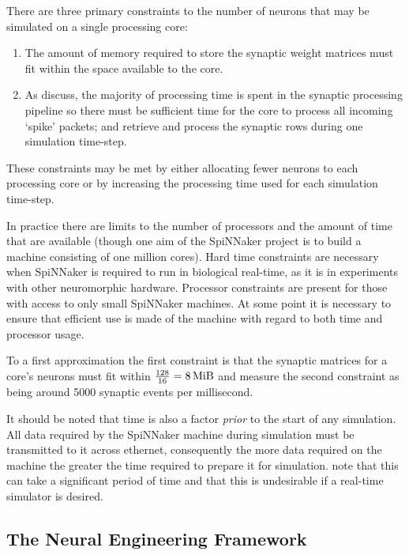 \documentclass[conference]{IEEEtran}
\begin{document}
There are three primary constraints to the number of neurons that may be simulated on a single processing core:

  \begin{enumerate}
    \item The amount of memory required to store the synaptic weight matrices must fit within the space available to the core.
    \item As \textcite{Sharp2013} discuss, the majority of processing time is spent in the synaptic processing pipeline so there must be sufficient time for the core to process all incoming `spike' packets; and retrieve and process the synaptic rows during one simulation time-step.
  \end{enumerate}

These constraints may be met by either allocating fewer neurons to each processing core or by increasing the processing time used for each simulation time-step.

In practice there are limits to the number of processors and the amount of time that are available (though one aim of the SpiNNaker project is to build a machine consisting of one million cores). Hard time constraints are necessary when SpiNNaker is required to run in biological real-time, as it is in experiments with other neuromorphic hardware. Processor constraints are present for those with access to only small SpiNNaker machines. At some point it is necessary to ensure that efficient use is made of the machine with regard to both time and processor usage.

To a first approximation the first constraint is that the synaptic matrices for a core's neurons must fit within $\frac{128}{16} = \SI{8}{\mebi\byte}$ and \textcite[\S III.C]{Sharp2013} measure the second constraint as being around \num{5000} synaptic events per millisecond.

It should be noted that time is also a factor \textit{prior} to the start of any simulation. All data required by the SpiNNaker machine during simulation must be transmitted to it across ethernet, consequently the more data required on the machine the greater the time required to prepare it for simulation. \textcite{Sharp2013} note that this can take a significant period of time and that this is undesirable if a real-time simulator is desired.

  \subsection{The Neural Engineering Framework}
  \label{sef:background/nef}
\end{document}
